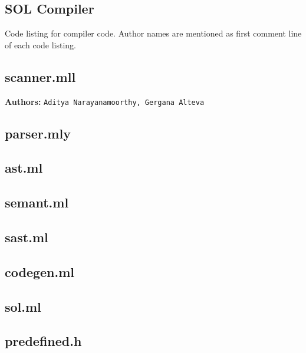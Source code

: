 \documentclass[letterpaper,12pt]{article}
\begin{document}
\begin{appendices}

\section{SOL Compiler}

Code listing for compiler code. Author names are mentioned as first comment line of each code listing.

    \subsection{scanner.mll}
    \textbf{Authors:} \texttt{Aditya Narayanamoorthy, Gergana Alteva}\\
    

    \subsection{parser.mly}
    

    \subsection{ast.ml}
    

    \subsection{semant.ml}
    

    \subsection{sast.ml}
    

    \subsection{codegen.ml}
    

    \subsection{sol.ml}
    

    \subsection{predefined.h}
    


\end{appendices}
\end{document}
